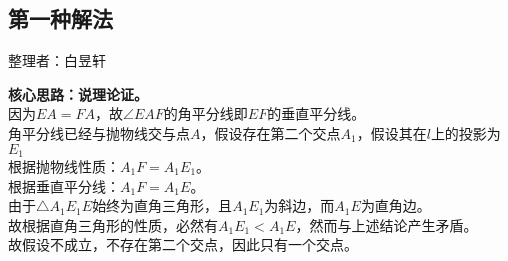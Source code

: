 \documentclass[UTF8]{ctexart}
\begin{document}
\newpage

\subsection{第一种解法}
    \begin{center}
        整理者：白昱轩
    \end{center}
    {
        \small
        \textbf{核心思路：说理论证。}\\[5mm]
        因为$EA=FA$，故$\angle EAF$的角平分线即$EF$的垂直平分线。\\[5mm]
        角平分线已经与抛物线交与点$A$，假设存在第二个交点$A_1$，假设其在$l$上的投影为$E_1$\\[5mm]
        根据抛物线性质：$A_1F=A_1E_1$。\\[5mm]
        根据垂直平分线：$A_1F=A_1E$。\\[5mm]
        由于$\triangle A_1E_1E$始终为直角三角形，且$A_1E_1$为斜边，而$A_1E$为直角边。\\[5mm]
        故根据直角三角形的性质，必然有$A_1E_1<A_1E$，然而与上述结论产生矛盾。\\[5mm]
        故假设不成立，不存在第二个交点，因此只有一个交点。\vspace{5pt}
    }
\end{document}

